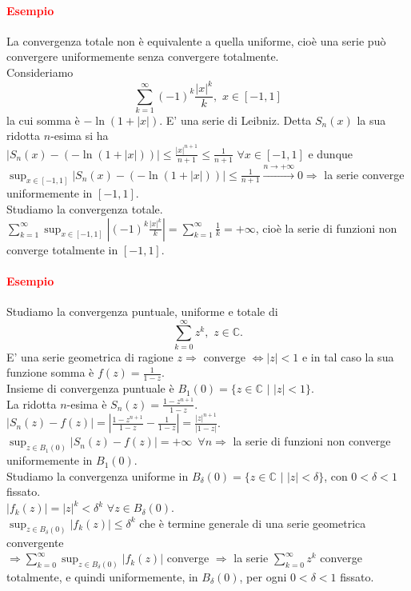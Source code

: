 \documentclass{article}
\newcommand{\C}{\mathbb{C}}
\begin{document}
\paragraph{\textcolor{red}{Esempio}}
La convergenza totale non è equivalente a quella uniforme, cioè una serie può convergere uniformemente senza convergere totalmente.\\
Consideriamo 
\begin{equation*}
    \sum_{k=1}^{\infty}(-1)^k \frac{|x|^k}{k},\,\, x \in [-1,1]    
\end{equation*}
la cui somma è $-\ln (1+|x|)$. E' una serie di Leibniz. Detta $S_n(x)$ la sua ridotta $n$-esima si ha $|S_n(x)-(-\ln (1+|x|))|\leq \frac{|x|^{n+1}}{n+1}\leq \frac{1}{n+1}\,\, \forall x \in [-1,1]$ e dunque $\sup_{x \in [-1,1]}|S_n(x)-(-\ln (1+|x|))| \leq \frac{1}{n+1}\xrightarrow{n \rightarrow +\infty} 0 \Rightarrow$ la serie converge uniformemente in $[-1,1]$.\\ Studiamo la convergenza totale. $\sum_{k=1}^{\infty}\sup_{x \in [-1,1]}|(-1)^k\frac{|x|^k}{k}|= \sum_{k=1}^{\infty} \frac{1}{k}=+\infty$, cioè la serie di funzioni non converge totalmente in $[-1,1]$.  

\paragraph{\textcolor{red}{Esempio}}
Studiamo la convergenza puntuale, uniforme e totale di 
\begin{equation*}
    \sum_{k=0}^{\infty}z^k,\,\, z\in \C.    
\end{equation*}
E' una serie geometrica di ragione $z \Rightarrow$ converge $\Leftrightarrow |z|<1$ e in tal caso la sua funzione somma è $f(z)=\frac{1}{1-z}$.\\
Insieme di convergenza puntuale è $B_1(0)=\{z \in \C\,\,|\,\, |z|< 1\}$.\\
La ridotta $n$-esima è $S_n(z)=\frac{1-z^{n+1}}{1-z}$.\\
$|S_n(z)-f(z)|=|\frac{1-z^{n+1}}{1-z}-\frac{1}{1-z}|=\frac{|z|^{n+1}}{|1-z|}$.\\
$\sup_{z \in B_1(0)}|S_n(z)-f(z)|=+\infty \,\,\, \forall n \Rightarrow$ la serie di funzioni non converge uniformemente in $B_1(0)$.\\
Studiamo la convergenza uniforme in $B_\delta(0)=\{z \in \C\,\, |\,\, |z|< \delta\}$, con $0 < \delta< 1$ fissato.\\
$|f_k(z)|=|z|^k< \delta^k \,\, \forall z \in B_\delta(0)$.\\
$\sup_{z \in B_\delta(0)}|f_k(z)|\leq \delta^k$ che è termine generale di una serie geometrica convergente\\ $\Rightarrow \sum_{k=0}^{\infty}\sup_{z\in B_\delta(0)}|f_k(z)|$ converge $\Rightarrow$ la serie $\sum_{k=0}^{\infty} z^k$ converge totalmente, e quindi uniformemente, in $B_\delta(0)$, per ogni $0 < \delta < 1$ fissato.
\end{document}
